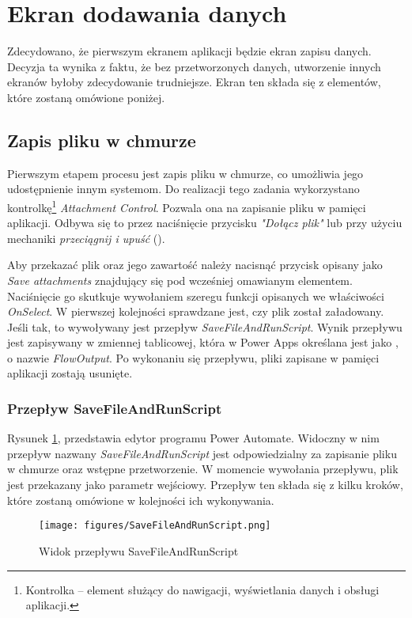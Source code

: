 \section{Ekran dodawania danych}

Zdecydowano, że pierwszym ekranem aplikacji będzie ekran zapisu danych. Decyzja ta wynika z faktu, że bez przetworzonych danych, utworzenie innych ekranów byłoby zdecydowanie trudniejsze. Ekran ten składa się z elementów, które zostaną omówione poniżej.

\subsection{Zapis pliku w chmurze}
Pierwszym etapem procesu jest zapis pliku w chmurze, co umożliwia jego udostępnienie innym systemom. Do realizacji tego zadania wykorzystano kontrolkę\footnote{Kontrolka -- element służący do nawigacji, wyświetlania danych i obsługi aplikacji.} \emph{Attachment Control}. Pozwala ona na zapisanie pliku w pamięci aplikacji. Odbywa się to przez naciśnięcie przycisku \emph{"Dołącz plik"} lub przy użyciu mechaniki \emph{przeciągnij i upuść} (). 

Aby przekazać plik oraz jego zawartość należy nacisnąć przycisk opisany jako \emph{Save attachments} znajdujący się pod wcześniej omawianym elementem. Naciśnięcie go skutkuje wywołaniem szeregu funkcji opisanych we właściwości \emph{OnSelect}. W pierwszej kolejności sprawdzane jest, czy plik został załadowany. Jeśli tak, to wywoływany jest przepływ \emph{SaveFileAndRunScript}. Wynik przepływu jest zapisywany w zmiennej tablicowej, która w Power Apps określana jest jako , o nazwie \emph{FlowOutput}. Po wykonaniu się przepływu, pliki zapisane w pamięci aplikacji zostają usunięte.



\subsubsection{Przepływ SaveFileAndRunScript}
Rysunek \ref{fig:savefileandrunscript}, przedstawia edytor programu Power Automate. Widoczny w nim przepływ nazwany \emph{SaveFileAndRunScript} jest odpowiedzialny za zapisanie pliku w chmurze oraz wstępne przetworzenie. W momencie wywołania przepływu, plik jest przekazany jako parametr wejściowy. Przepływ ten składa się z kilku kroków, które zostaną omówione w kolejności ich wykonywania.

\begin{figure}[t]
    \centering
    \texttt{[image: figures/SaveFileAndRunScript.png]}
    \caption{Widok przepływu SaveFileAndRunScript}
    \label{fig:savefileandrunscript}
\end{figure}

